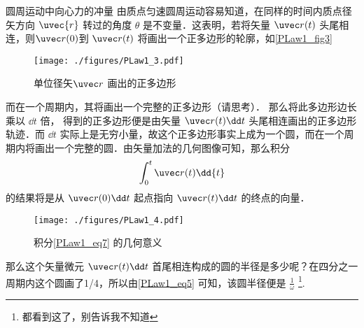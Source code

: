 \begin{example}{圆周运动中向心力的冲量}
由质点匀速圆周运动容易知道，在同样的时间内质点径矢方向 $\uvec{r}$ 转过的角度 $\theta$ 是不变量．这表明，若将矢量 $\uvec r(t)$ 头尾相连，则$\uvec r(0)$到 $\uvec r(t)$ 将画出一个正多边形的轮廓，如\autoref{PLaw1_fig3} 
\begin{figure}[ht]
\centering
\texttt{[image: ./figures/PLaw1\_3.pdf]}
\caption{单位径矢$\uvec r$ 画出的正多边形} \label{PLaw1_fig3}
\end{figure}
而在一个周期内，其将画出一个完整的正多边形（请思考）．
那么将此多边形边长乘以 $\dd t$ 倍， 得到的正多边形便是由矢量 $\uvec r(t)\dd t$ 头尾相连画出的正多边形轨迹．而 $\dd t$ 实际上是无穷小量，故这个正多边形事实上成为一个圆，而在一个周期内将画出一个完整的圆．由矢量加法的几何图像可知，那么积分
\begin{equation}\label{PLaw1_eq7}
\int_{0}^{t}\uvec r(t) \dd{t}
\end{equation}
的结果将是从 $\uvec r(0)\dd t$ 起点指向 $\uvec r(t)\dd t$ 的终点的向量．
\begin{figure}[ht]
\centering
\texttt{[image: ./figures/PLaw1\_4.pdf]}
\caption{积分\autoref{PLaw1_eq7} 的几何意义} \label{PLaw1_fig4}
\end{figure}
那么这个矢量微元 $\uvec r(t)\dd t$ 首尾相连构成的圆的半径是多少呢？在四分之一周期内这个圆画了1/4，所以由\autoref{PLaw1_eq5} 可知，该圆半径便是 $\frac{1}{\omega}$ \footnote{都看到这了，别告诉我不知道}.
\end{example}
